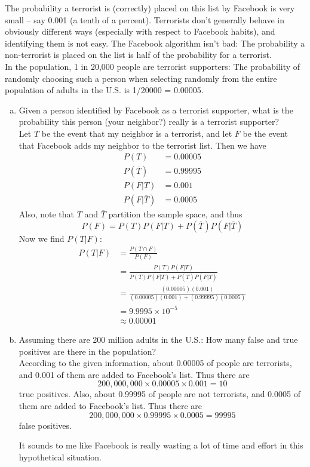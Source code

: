 \documentclass{scrartcl}
\begin{document}
\begin{enumerate}
The probability a terrorist is (correctly) placed on this list by Facebook is very small – say 0.001 (a tenth of a percent). Terrorists don’t generally behave in obviously different ways (especially with respect to Facebook habits), and identifying them is not easy. The Facebook algorithm isn’t bad: The probability a non-terrorist is placed on the list is half of the probability for a terrorist.\\

In the population, 1 in 20,000 people are terrorist supporters: The probability of randomly choosing such a person when selecting randomly from the entire population of adults in the U.S. is 1/20000 = 0.00005.\\

\begin{enumerate}[a)]
\item Given a person identified by Facebook as a terrorist supporter, what is the probability this person (your neighbor?) really is a terrorist supporter?\\

  Let $T$ be the event that my neighbor is a terrorist, and let $F$ be the event that Facebook adds my neighbor to the terrorist list. Then we have
  \begin{align*}
    P(T) &= 0.00005\\
    P(\overline{T}) &= 0.99995\\
    P(F|T) &= 0.001\\
    P(F|\overline{T}) &= 0.0005
  \end{align*}
Also, note that $T$ and $\overline{T}$ partition the sample space, and thus $$P(F) = P(T)P(F|T) + P(\overline{T})P(F|\overline{T})$$ Now we find $P(T|F)$:
  \begin{align*}
    P(T|F) &= \frac{P(T \cap F)}{P(F)}\\
           &= \frac{P(T)P(F|T)}{P(T)P(F|T) + P(\overline{T})P(F|\overline{T})}\\
           &= \frac{(0.00005)(0.001)}{(0.00005)(0.001) + (0.99995)(0.0005)}\\
           &= 9.9995 \times 10^{-5}\\
           &\approx 0.00001
  \end{align*}

\item Assuming there are 200 million adults in the U.S.: How many false and true positives are there in the population?\\

  According to the given information, about 0.00005 of people are terrorists, and 0.001 of them are added to Facebook's list. Thus there are $$200,000,000 \times 0.00005 \times 0.001 = 10$$ true positives. Also, about 0.99995 of people are not terrorists, and 0.0005 of them are added to Facebook's list. Thus there are $$200,000,000 \times 0.99995 \times 0.0005 = 99995$$ false positives.

It sounds to me like Facebook is really wasting a lot of time and effort in this hypothetical situation.
\end{enumerate}
\end{enumerate}
\end{document}
